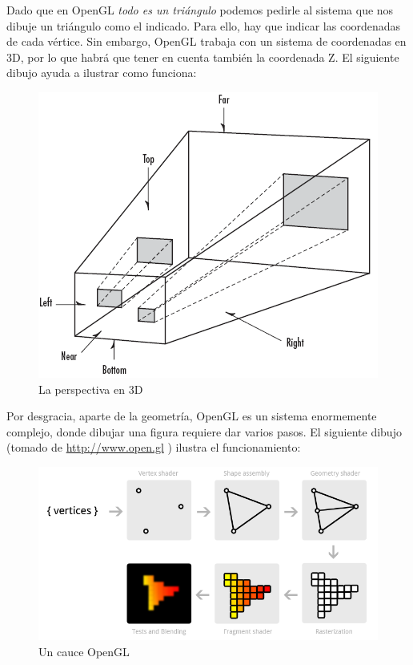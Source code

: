 \documentclass[a4paper,12pt,spanish]{sphinxmanual}
\begin{document}
Dado que en OpenGL \emph{todo es un triángulo} podemos pedirle al sistema que nos dibuje un triángulo como el indicado. Para ello, hay que indicar las coordenadas de cada vértice. Sin embargo, OpenGL trabaja con un sistema de coordenadas en 3D, por lo que habrá que tener en cuenta también la coordenada Z. El siguiente dibujo ayuda a ilustrar como funciona:
\begin{figure}[htbp]
\centering
\capstart

\includegraphics{perspectiva.png}
\caption{La perspectiva en 3D}\end{figure}

Por desgracia, aparte de la geometría, OpenGL es un sistema enormemente complejo, donde dibujar una figura requiere dar varios pasos. El siguiente dibujo (tomado de \href{http://Open.gl}{http://www.open.gl} ) ilustra el funcionamiento:
\begin{figure}[htbp]
\centering
\capstart

\includegraphics{cauce.png}
\caption{Un cauce OpenGL}\end{figure}
\end{document}
